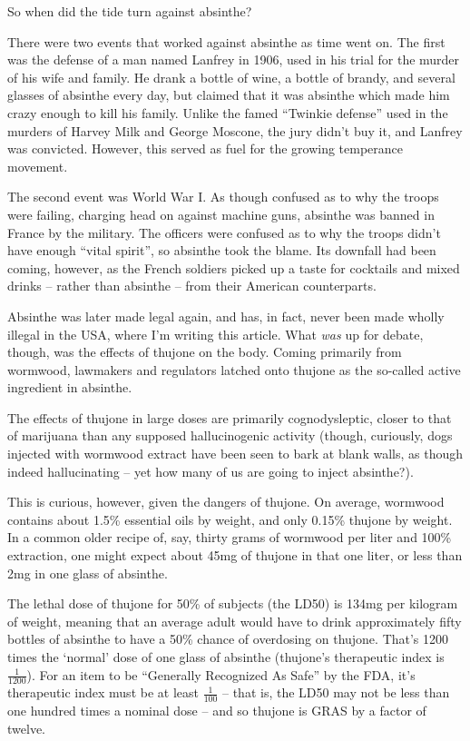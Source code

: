 \documentclass[12pt,letterpaper,oneside]{memoir}
\begin{document}
  So when did the tide turn against absinthe?

  There were two events that worked against absinthe as time went on.  The first was the defense of a man named Lanfrey in 1906, used in his trial for the murder of his wife and family.  He drank a bottle of wine, a bottle of brandy, and several glasses of absinthe every day, but claimed that it was absinthe which made him crazy enough to kill his family.  Unlike the famed ``Twinkie defense'' used in the murders of Harvey Milk and George Moscone, the jury didn't buy it, and Lanfrey was convicted.  However, this served as fuel for the growing temperance movement.

  The second event was World War I.  As though confused as to why the troops were failing, charging head on against machine guns, absinthe was banned in France by the military.  The officers were confused as to why the troops didn't have enough ``vital spirit'', so absinthe took the blame.  Its downfall had been coming, however, as the French soldiers picked up a taste for cocktails and mixed drinks -- rather than absinthe -- from their American counterparts.

  Absinthe was later made legal again, and has, in fact, never been made wholly illegal in the USA, where I'm writing this article.  What \textit{was} up for debate, though, was the effects of thujone on the body.  Coming primarily from wormwood, lawmakers and regulators latched onto thujone as the so-called active ingredient in absinthe.

  The effects of thujone in large doses are primarily cognodysleptic, closer to that of marijuana than any supposed hallucinogenic activity (though, curiously, dogs injected with wormwood extract have been seen to bark at blank walls, as though indeed hallucinating -- yet how many of us are going to inject absinthe?).

  This is curious, however, given the dangers of thujone.  On average, wormwood contains about 1.5\% essential oils by weight, and only 0.15\% thujone by weight.  In a common older recipe of, say, thirty grams of wormwood per liter and 100\% extraction, one might expect about 45mg of thujone in that one liter, or less than 2mg in one glass of absinthe.

  The lethal dose of thujone for 50\% of subjects (the LD50) is 134mg per kilogram of weight, meaning that an average adult would have to drink approximately fifty bottles of absinthe to have a 50\% chance of overdosing on thujone.  That's 1200 times the `normal' dose of one glass of absinthe (thujone's therapeutic index is $\frac{1}{1200}$).  For an item to be ``Generally Recognized As Safe'' by the FDA, it's therapeutic index must be at least $\frac{1}{100}$ -- that is, the LD50 may not be less than one hundred times a nominal dose -- and so thujone is GRAS by a factor of twelve.
\end{document}
